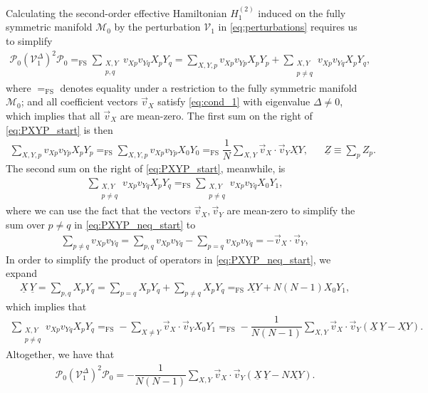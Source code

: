 \documentclass[nofootinbib,notitlepage,11pt]{revtex4-2}
\newcommand{\f}[2]{\dfrac{#1}{#2}} %
\newcommand{\p}[1]{\left(#1\right)} %
\renewcommand{\c}{\cdot} %
\renewcommand{\v}{\vec} %
\newcommand{\1}{\mathds{1}}
\newcommand{\M}{\mathcal{M}}
\renewcommand{\P}{\mathcal{P}}
\newcommand{\V}{\mathcal{V}}
\newcommand{\EQFS}{=_{\text{FS}}}
\newcommand{\col}{\underline}
\begin{document}
Calculating the second-order effective Hamiltonian $H_1^{(2)}$ induced
on the fully symmetric manifold $\M_0$ by the perturbation $\V_1$ in
\eqref{eq:perturbations} requires us to simplify
\begin{align}
  \P_0 \p{\V_1^\Delta}^2 \P_0
  \EQFS \sum_{\substack{X,Y\\p,q}} v_{Xp} v_{Yq} X_p Y_q
  = \sum_{X,Y,p} v_{Xp} v_{Yp} X_p Y_p
  + \sum_{\substack{X,Y\\p\ne q}} v_{Xp} v_{Yq} X_p Y_q,
  \label{eq:PXYP_start}
\end{align}
where $\EQFS$ denotes equality under a restriction to the fully
symmetric manifold $\M_0$; and all coefficient vectors $\v v_X$
satisfy \eqref{eq:cond_1} with eigenvalue $\Delta\ne0$, which implies
that all $\v v_X$ are mean-zero.  The first sum on the right of
\eqref{eq:PXYP_start} is then
\begin{align}
  \sum_{X,Y,p} v_{Xp} v_{Yp} X_p Y_p
  \EQFS \sum_{X,Y,p} v_{Xp} v_{Yp} X_0 Y_0
  \EQFS \f1N \sum_{X,Y} \v v_X \c\v v_Y \col{XY},
  &&
  \col{Z} \equiv \sum_p Z_p.
  \label{eq:PXYP_eq}
\end{align}
The second sum on the right of \eqref{eq:PXYP_start}, meanwhile, is
\begin{align}
  \sum_{\substack{X,Y\\p\ne q}} v_{Xp} v_{Yq} X_p Y_q
  \EQFS \sum_{\substack{X,Y\\p\ne q}} v_{Xp} v_{Yq} X_0 Y_1,
  \label{eq:PXYP_neq_start}
\end{align}
where we can use the fact that the vectors $\v v_X,\v v_Y$ are
mean-zero to simplify the sum over $p\ne q$ in
\eqref{eq:PXYP_neq_start} to
\begin{align}
  \sum_{p\ne q} v_{Xp} v_{Yq}
  = \sum_{p,q} v_{Xp} v_{Yq} - \sum_{p=q} v_{Xp} v_{Yq}
  = - \v v_X\c\v v_Y,
\end{align}
In order to simplify the product of operators in
\eqref{eq:PXYP_neq_start}, we expand
\begin{align}
  \col{X}\,\col{Y} = \sum_{p,q} X_p Y_q
  = \sum_{p=q} X_p Y_q + \sum_{p\ne q} X_p Y_q
  \EQFS \col{XY} + N\p{N-1} X_0 Y_1,
  \label{eq:PXYP_neq_ops}
\end{align}
which implies that
\begin{align}
  \sum_{\substack{X,Y\\p\ne q}} v_{Xp} v_{Yq} X_p Y_q
  \EQFS - \sum_{X\ne Y} \v v_X\c\v v_Y X_0 Y_1
  \EQFS - \f1{N\p{N-1}}\sum_{X,Y} \v v_X\c\v v_Y
  \p{\col{X}\,\col{Y} - \col{XY}}.
  \label{eq:PXYP_neq}
\end{align}
Altogether, we have that
\begin{align}
  \P_0 \p{\V_1^\Delta}^2 \P_0
  = - \f1{N\p{N-1}} \sum_{X,Y} \v v_X \c\v v_Y
  \p{\col{X}\,\col{Y} - N \col{XY}}.
\end{align}
\end{document}
